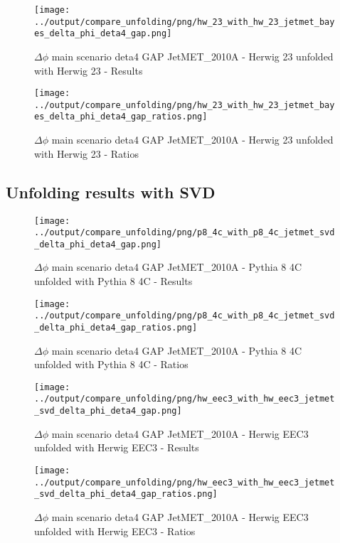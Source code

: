 \documentclass[11pt]{book}
\begin{document}
\begin{figure}[ht]
\centering
\texttt{[image: ../output/compare\_unfolding/png/hw\_23\_with\_hw\_23\_jetmet\_bayes\_delta\_phi\_deta4\_gap.png]}
\caption{$\Delta\phi$ main scenario deta4 GAP JetMET\_2010A - Herwig 23 unfolded with Herwig 23 - Results}
\label{hw_23_hw_23_jetmet_bayes_delta_phi_deta4_gap_a}
\end{figure}

\begin{figure}[ht]
\centering
\texttt{[image: ../output/compare\_unfolding/png/hw\_23\_with\_hw\_23\_jetmet\_bayes\_delta\_phi\_deta4\_gap\_ratios.png]}
\caption{$\Delta\phi$ main scenario deta4 GAP JetMET\_2010A - Herwig 23 unfolded with Herwig 23 - Ratios}
\label{hw_23_hw_23_jetmet_bayes_delta_phi_deta4_gap_b}
\end{figure}


\clearpage
\subsection{Unfolding results with SVD}

\begin{figure}[ht]
\centering
\texttt{[image: ../output/compare\_unfolding/png/p8\_4c\_with\_p8\_4c\_jetmet\_svd\_delta\_phi\_deta4\_gap.png]}
\caption{$\Delta\phi$ main scenario deta4 GAP JetMET\_2010A - Pythia 8 4C unfolded with Pythia 8 4C - Results}
\label{p8_p8_jetmet_svd_delta_phi_deta4_gap_a}
\end{figure}

\begin{figure}[ht]
\centering
\texttt{[image: ../output/compare\_unfolding/png/p8\_4c\_with\_p8\_4c\_jetmet\_svd\_delta\_phi\_deta4\_gap\_ratios.png]}
\caption{$\Delta\phi$ main scenario deta4 GAP JetMET\_2010A - Pythia 8 4C unfolded with Pythia 8 4C - Ratios}
\label{p8_p8_jetmet_svd_delta_phi_deta4_gap_b}
\end{figure}

\begin{figure}[ht]
\centering
\texttt{[image: ../output/compare\_unfolding/png/hw\_eec3\_with\_hw\_eec3\_jetmet\_svd\_delta\_phi\_deta4\_gap.png]}
\caption{$\Delta\phi$ main scenario deta4 GAP JetMET\_2010A - Herwig EEC3 unfolded with Herwig EEC3 - Results}
\label{hw_eec3_hw_eec3_jetmet_svd_delta_phi_deta4_gap_a}
\end{figure}

\begin{figure}[ht]
\centering
\texttt{[image: ../output/compare\_unfolding/png/hw\_eec3\_with\_hw\_eec3\_jetmet\_svd\_delta\_phi\_deta4\_gap\_ratios.png]}
\caption{$\Delta\phi$ main scenario deta4 GAP JetMET\_2010A - Herwig EEC3 unfolded with Herwig EEC3 - Ratios}
\label{hw_eec3_hw_eec3_jetmet_svd_delta_phi_deta4_gap_b}
\end{figure}
\end{document}
